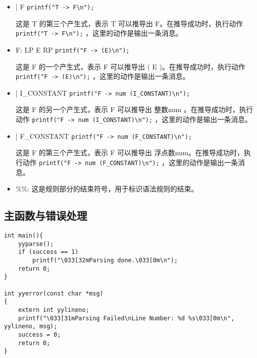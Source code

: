 \documentclass[lang=cn,11pt,a4paper]{elegantpaper}
\begin{document}
\begin{itemize}
    \item | F { \lstinline{printf("T -> F\n");} }
    
    这是 T 的第三个产生式，表示 T 可以推导出 F。在推导成功时，执行动作 { \lstinline{printf("T -> F\n");} }，这里的动作是输出一条消息。

    \item F: LP E RP { \lstinline{printf("F -> (E)\n");} }
    
    这是 F 的一个产生式，表示 F 可以推导出 ( E )。在推导成功时，执行动作 { \lstinline{printf("F -> (E)\n");} }，这里的动作是输出一条消息。
    
    \item | I\_CONSTANT { \lstinline{printf("F -> num (I_CONSTANT)\n");} }
    
    这是 F 的另一个产生式，表示 F 可以推导出 整数num 。在推导成功时，执行动作 { \lstinline{printf("F -> num (I_CONSTANT)\n");} }，这里的动作是输出一条消息。

    \item | F\_CONSTANT { \lstinline{printf("F -> num (F_CONSTANT)\n");} }
    
    这是 F 的第三个产生式，表示 F 可以推导出 浮点数num。在推导成功时，执行动作 { \lstinline{printf("F -> num (F_CONSTANT)\n");} }，这里的动作是输出一条消息。
    
    \item \%\%: 这是规则部分的结束符号，用于标识语法规则的结束。
\end{itemize}


\subsection{主函数与错误处理}

\begin{lstlisting}
int main(){
    yyparse();
    if (success == 1)
        printf("\033[32mParsing done.\033[0m\n");
    return 0;
}

int yyerror(const char *msg)
{
	extern int yylineno;
	printf("\033[31mParsing Failed\nLine Number: %d %s\033[0m\n", yylineno, msg);
    success = 0;
	return 0;
}
\end{lstlisting}
\end{document}

